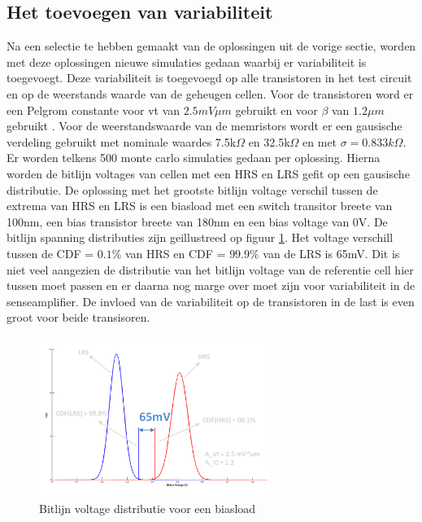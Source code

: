 \subsection{Het toevoegen van variabiliteit}\label{sec:varload}
Na een selectie te hebben gemaakt van de oplossingen uit de vorige sectie, worden met deze oplossingen nieuwe simulaties gedaan waarbij er variabiliteit is toegevoegt. Deze variabiliteit is toegevoegd op alle transistoren in het test circuit en op de weerstands waarde van de geheugen cellen. Voor de transistoren word er een Pelgrom constante voor vt van $2.5mV\mu m$ gebruikt en voor $\beta$ van $1.2\mu m$ gebruikt \cite{ppt:variatie}. Voor de weerstandswaarde van de memristors wordt er een gausische verdeling gebruikt met nominale waardes 7.5k$\Omega$ en 32.5k$\Omega$ en met $\sigma = 0.833k\Omega$. Er worden telkens 500 monte carlo simulaties gedaan per oplossing. Hierna worden de bitlijn voltages van cellen met een HRS en LRS gefit op een gausische distributie. De oplossing met het grootste bitlijn voltage verschil tussen de extrema van HRS en LRS is een biasload met een switch transitor breete van 100nm, een bias transistor breete van 180nm en een bias voltage van 0V. De bitlijn spanning distributies zijn geillustreed op figuur \ref{fig:distbias}. Het voltage verschill tussen de CDF = $0.1\%$ van HRS en CDF = $99.9\%$ van de LRS is 65mV. Dit is niet veel aangezien de distributie van het bitlijn voltage van de referentie cell hier tussen moet passen en er daarna nog marge over moet zijn voor variabiliteit in de senseamplifier. De invloed van de variabiliteit op de transistoren in de last is even groot voor beide transisoren.

\begin{figure}[!ht]
  \centering
  \includegraphics[width=0.67\textwidth]{../fig/hfdst-last-var1.png}
  \caption{Bitlijn voltage distributie voor een biasload}
  \label{fig:distbias}
\end{figure}

